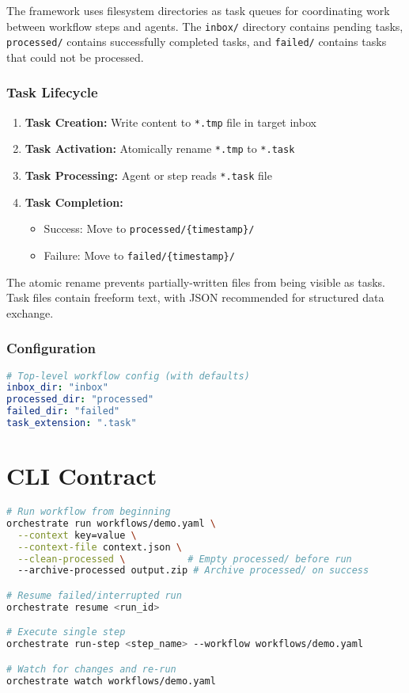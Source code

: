 \documentclass[11pt,a4paper]{article}
\begin{document}
The framework uses filesystem directories as task queues for coordinating work between workflow steps and agents. The \texttt{inbox/} directory contains pending tasks, \texttt{processed/} contains successfully completed tasks, and \texttt{failed/} contains tasks that could not be processed.

\subsubsection{Task Lifecycle}
\begin{enumerate}
    \item \textbf{Task Creation:} Write content to \texttt{*.tmp} file in target inbox
    \item \textbf{Task Activation:} Atomically rename \texttt{*.tmp} to \texttt{*.task}
    \item \textbf{Task Processing:} Agent or step reads \texttt{*.task} file
    \item \textbf{Task Completion:}
    \begin{itemize}
        \item Success: Move to \texttt{processed/\{timestamp\}/}
        \item Failure: Move to \texttt{failed/\{timestamp\}/}
    \end{itemize}
\end{enumerate}

The atomic rename prevents partially-written files from being visible as tasks. Task files contain freeform text, with JSON recommended for structured data exchange.

\subsubsection{Configuration}

\begin{lstlisting}[language=yaml, caption={Inbox Configuration}]
# Top-level workflow config (with defaults)
inbox_dir: "inbox"
processed_dir: "processed"
failed_dir: "failed"
task_extension: ".task"
\end{lstlisting}

\section{CLI Contract}

\begin{lstlisting}[language=bash, caption={CLI Commands}]
# Run workflow from beginning
orchestrate run workflows/demo.yaml \
  --context key=value \
  --context-file context.json \
  --clean-processed \           # Empty processed/ before run
  --archive-processed output.zip # Archive processed/ on success

# Resume failed/interrupted run
orchestrate resume <run_id>

# Execute single step
orchestrate run-step <step_name> --workflow workflows/demo.yaml

# Watch for changes and re-run
orchestrate watch workflows/demo.yaml
\end{lstlisting}
\end{document}
